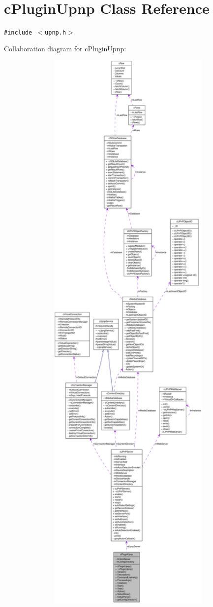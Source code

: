 \hypertarget{classcPluginUpnp}{
\section{cPluginUpnp Class Reference}
\label{classcPluginUpnp}
}
{\tt \#include $<$upnp.h$>$}

Collaboration diagram for cPluginUpnp:\nopagebreak
\begin{figure}[H]
\begin{center}
\leavevmode
\includegraphics[width=400pt]{classcPluginUpnp__coll__graph}
\end{center}
\end{figure}
